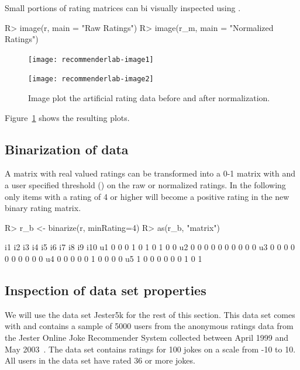 \documentclass[nojss]{jss}
\begin{document}
Small portions of rating matrices can bi visually inspected using
.

\begin{Schunk}
\begin{Sinput}
R> image(r, main = "Raw Ratings")
R> image(r_m, main = "Normalized Ratings")
\end{Sinput}
\end{Schunk}


\begin{figure}
\begin{minipage}[b]{.48\linewidth}
\centerline{\texttt{[image: recommenderlab-image1]}}
\end{minipage}
\begin{minipage}[b]{.48\linewidth}
\centerline{\texttt{[image: recommenderlab-image2]}}
\end{minipage}
\caption{Image plot
the artificial rating data before and after normalization.}
\label{fig:image1}
\end{figure}


Figure~\ref{fig:image1} shows the resulting plots.

\subsection{Binarization of data}

A matrix with real valued ratings can be transformed into a 0-1 matrix
with  and
a user specified threshold ()
on the raw or normalized ratings. In the following only
items with a rating of 4 or higher will become a positive
rating in the new binary rating matrix.
\begin{Schunk}
\begin{Sinput}
R> r_b <- binarize(r, minRating=4)
R> as(r_b, "matrix")
\end{Sinput}
\begin{Soutput}
   i1 i2 i3 i4 i5 i6 i7 i8 i9 i10
u1  0  0  0  1  0  1  0  1  0   0
u2  0  0  0  0  0  0  0  0  0   0
u3  0  0  0  0  0  0  0  0  0   0
u4  0  0  0  0  0  1  0  0  0   0
u5  1  0  0  0  0  0  0  1  0   1
\end{Soutput}
\end{Schunk}


\subsection{Inspection of data set properties}
We will use the data set Jester5k for the rest of this section.  This data set
comes with  and contains a sample of 5000 users from the
anonymous ratings data from the Jester Online Joke Recommender System collected
between April 1999 and May 2003~\citep{recommender:Goldberg:2001}. The
data set contains ratings for 100 jokes on a scale from -10 to 10. All
users in the data set have rated 36 or more jokes.
\end{document}
